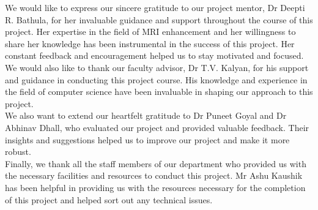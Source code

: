 

\begin{acknowledgementslong} %


We would like to express our sincere gratitude to our project mentor, Dr Deepti R. Bathula, for her invaluable guidance and support throughout the course of this project. Her expertise in the field of MRI enhancement and her willingness to share her knowledge has been instrumental in the success of this project. Her constant feedback and encouragement helped us to stay motivated and focused.\\

We would also like to thank our faculty advisor, Dr T.V. Kalyan, for his support and guidance in conducting this project course. His knowledge and experience in the field of computer science have been invaluable in shaping our approach to this project.\\

We also want to extend our heartfelt gratitude to Dr Puneet Goyal and Dr Abhinav Dhall, who evaluated our project and provided valuable feedback. Their insights and suggestions helped us to improve our project and make it more robust.\\

Finally, we thank all the staff members of our department who provided us with the necessary facilities and resources to conduct this project. Mr Ashu Kaushik has been helpful in providing us with the resources necessary for the completion of this project and helped sort out any technical issues.


\end{acknowledgementslong}


